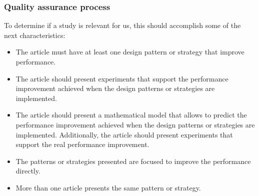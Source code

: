 \subsubsection {Quality assurance process}

To determine if a study is relevant for us, this should accomplish some of the next characteristics:

\begin{itemize}
	\item The article must have at least one design pattern or strategy that improve performance.
	
	\item The article should present experiments that support the performance improvement achieved when the design patterns or strategies are implemented.
	
	\item The article should present a mathematical model that allows to predict the performance improvement achieved when the design patterns or strategies are implemented. Additionally, the article should present experiments that support the real performance improvement.
	
	\item The patterns or strategies presented are focused to improve the performance directly.
	
	\item More than one article presents the same pattern or strategy.
\end{itemize}

